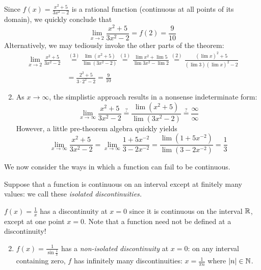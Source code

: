 \begin{examples}{}{}
	\exstart Since $f(x)=\frac{x^2+5}{3x^2-2}$ is a rational function (continuous at all points of its domain), we quickly conclude that
	\[
		\lim\limits_{x\to 2}\frac{x^2+5}{3x^2-2}=f(2)=\frac 9{10}
	\]
	Alternatively, we may tediously invoke the other parts of the theorem:
	\begin{align*}
		\lim\limits_{x\to 2}\frac{x^2+5}{3x^2-2}
		&\overset{(3)}{=} \frac{\lim(x^2+5)}{\lim(3x^2-2)} \overset{(1)}{=} 
		\frac{\lim x^2+\lim 5}{\lim 3x^2-\lim 2} \overset{(2)}{=} 
		\frac{(\lim x)^2+5}{(\lim 3)(\lim x)^2-2}\\
		&=\frac{2^2+5}{3\cdot 2^2-2} =\frac 9{10}
	\end{align*}
	\begin{enumerate}\setcounter{enumi}{1}
		\item As $x\to\infty$, the simplistic approach results in a nonsense indeterminate form:
		\[
			\lim_{x\to\infty}\frac{x^2+5}{3x^2-2} \overset{\text{?}}{=} 
			\frac{\lim(x^2+5)}{\lim(3x^2-2)} \overset{\text{?}}{=} 
			\frac\infty\infty
		\]
		However, a little pre-theorem algebra quickly yields\footnotemark
		\[
			\lim_{x\to\infty}\frac{x^2+5}{3x^2-2} 
			=\lim_{x\to\infty}\frac{1+5x^{-2}}{3-2x^{-2}} 
			=\frac{\lim(1+5x^{-2})}{\lim(3-2x^{-2})} 
			=\frac 13
		\]
	\end{enumerate}
\end{examples}


\vfil

\goodbreak



We now consider the ways in which a function can fail to be continuous.

\begin{defn}{}{}
	Suppose that a function is continuous on an interval except at finitely many values: we call these \emph{isolated discontinuities.}
\end{defn}

\begin{examples}{}{}
	\exstart $f(x)=\frac 1x$ has a discontinuity at $x=0$ since it is continuous on the interval $\mathbb{R}$, except at one point $x=0$. Note that a function need not be defined at a discontinuity!
	\begin{enumerate}\setcounter{enumi}{1}
	  \item $f(x)=\frac 1{\sin \frac 1x}$ has a \emph{non-isolated discontinuity} at $x=0$: on any interval containing zero, $f$ has infinitely many discontinuities: $x=\frac 1{\pi n}$ where $\left| n\right|\in\mathbb{N}$.
	\end{enumerate}
\end{examples}


